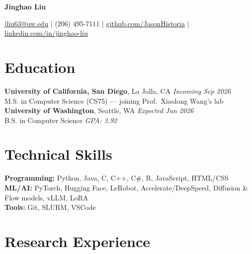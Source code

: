 \documentclass[a4paper,10pt]{article}
\begin{document}
\centerline{\Large \textbf{Jinghao Liu}}

\begin{center}
\href{mailto:jliu63@uw.edu}{jliu63@uw.edu}
\hspace{0.3cm} | \hspace{0.3cm} (206) 495-7111
\hspace{0.3cm} | \hspace{0.3cm}
\href{https://github.com/JasonHistoria}{github.com/JasonHistoria}
\hspace{0.3cm} | \hspace{0.3cm}
\href{https://www.linkedin.com/in/jinghao-liu-2b3b0b34b/}{linkedin.com/in/jinghao-liu}
\end{center}

\section*{Education}
\textbf{University of California, San Diego}, La Jolla, CA \hfill \textit{Incoming Sep 2026} \\
M.S. in Computer Science (CS75) --- joining Prof.\ Xiaolong Wang's lab \\[2pt]
\textbf{University of Washington}, Seattle, WA \hfill \textit{Expected Jun 2026} \\
B.S. in Computer Science \hfill \textit{GPA: 3.92}

\section*{Technical Skills}
\textbf{Programming:} Python, Java, C, C++, C\#, R, JavaScript, HTML/CSS \\
\textbf{ML/AI:} PyTorch, Hugging Face, LeRobot, Accelerate/DeepSpeed, Diffusion \& Flow models, vLLM, LoRA \\
\textbf{Tools:} Git, SLURM, VSCode

\section*{Research Experience}
\end{document}
